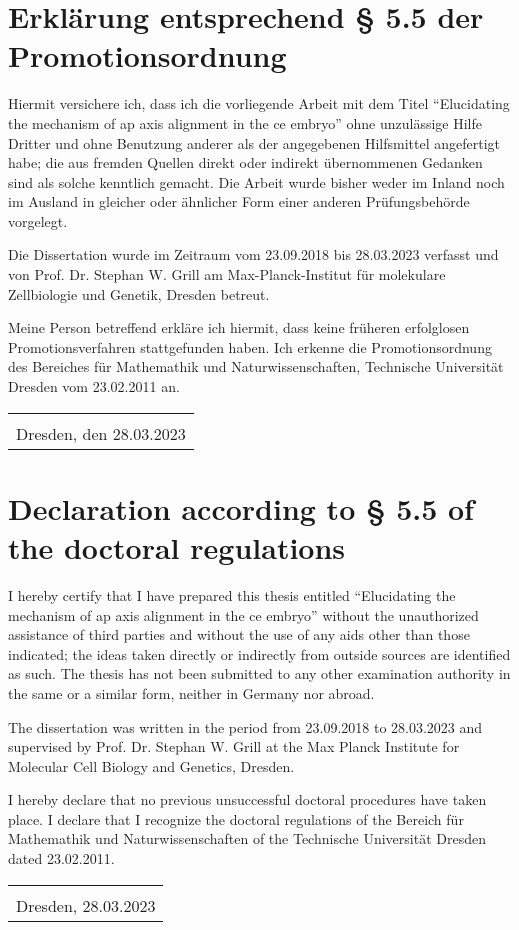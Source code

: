 \thispagestyle{plain}
\section*{Erklärung entsprechend § 5.5 der Promotionsordnung}
Hiermit versichere ich, dass ich die vorliegende Arbeit mit dem Titel \enquote{Elucidating the mechanism of \acs{ap} axis alignment in the \acs{ce} embryo} ohne unzulässige Hilfe Dritter und ohne Benutzung anderer als der angegebenen Hilfsmittel angefertigt habe; die aus fremden Quellen direkt oder indirekt übernommenen Gedanken sind als solche kenntlich gemacht. Die Arbeit wurde bisher weder im Inland noch im Ausland in gleicher oder ähnlicher Form einer anderen Prüfungsbehörde vorgelegt.

Die Dissertation wurde im Zeitraum vom 23.09.2018 bis 28.03.2023 verfasst und von Prof. Dr. Stephan W. Grill am Max-Planck-Institut für molekulare Zellbiologie und Genetik, Dresden betreut.

Meine Person betreffend erkläre ich hiermit, dass keine früheren erfolglosen Promotionsverfahren stattgefunden haben. Ich erkenne die Promotionsordnung des Bereiches für Mathemathik und Naturwissenschaften, Technische Universität Dresden vom 23.02.2011 an.

\vspace{10mm}
\begin{tabular}{@{}p{2.5in}@{}}
\hrulefill \\
Dresden, den 28.03.2023
\end{tabular}

\vspace{10mm}
\section*{Declaration according to § 5.5 of the doctoral regulations}
I hereby certify that I have prepared this thesis entitled \enquote{Elucidating the mechanism of \acs{ap} axis alignment in the \acs{ce} embryo} without the unauthorized assistance of third parties and without the use of any aids other than those indicated; the ideas taken directly or indirectly from outside sources are identified as such. The thesis has not been submitted to any other examination authority in the same or a similar form, neither in Germany nor abroad.

The dissertation was written in the period from 23.09.2018 to 28.03.2023 and supervised by Prof. Dr. Stephan W. Grill at the Max Planck Institute for Molecular Cell Biology and Genetics, Dresden.

I hereby declare that no previous unsuccessful doctoral procedures have taken place. I declare that I recognize the doctoral regulations of the Bereich für Mathemathik und Naturwissenschaften of the Technische Universität Dresden dated 23.02.2011.

\vspace{10mm}
\begin{tabular}{@{}p{2.5in}@{}}
\hrulefill \\
Dresden, 28.03.2023
\end{tabular}
